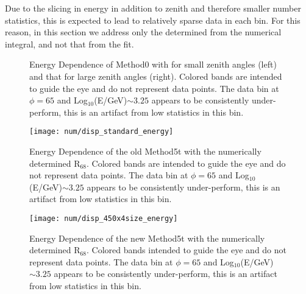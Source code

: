 \documentclass[main.tex]{subfiles}
\begin{document}
Due to the slicing in energy in addition to zenith and therefore smaller number statistics, this is expected to lead to relatively sparse data in each bin. For this reason, in this section we address only the \rse determined from the numerical integral, and not that from the fit.

\begin{figure}[htbp]
  \centering
  \caption[Energy Dependence of Method0.]{Energy Dependence of Method0 with \rse for small zenith angles (left) and that for large zenith angles (right). Colored bands are intended to guide the eye and do not represent data points. The data bin at $\phi = 65$ and Log$_{10}$(E/GeV)$\sim 3.25$ appears to be consistently under-perform, this is an artifact from low statistics in this bin.}
  \label{fig:energy_reg}
\end{figure}

\begin{figure}[htbp]
  \centering
  \texttt{[image: num/disp\_standard\_energy]}
  \caption[Energy Dependence of the old Method5t.]{Energy Dependence of the old Method5t with the numerically determined R$_{68}$. Colored bands are intended to guide the eye and do not represent data points. The data bin at $\phi = 65$ and Log$_{10}$(E/GeV)$\sim 3.25$  appears to be consistently under-perform, this is an artifact from low statistics in this bin.}
  \label{fig:energy_disp_standard}    
\end{figure}

\begin{figure}[htbp]
  \centering
  \texttt{[image: num/disp\_450x4size\_energy]}
  \caption[Energy Dependence of the new Method5t.]{Energy Dependence of the new Method5t with the numerically determined R$_{68}$. Colored bands intended to guide the eye and do not represent data points. The data bin at $\phi = 65$ and Log$_{10}$(E/GeV)$\sim 3.25$  appears to be consistently under-perform, this is an artifact from low statistics in this bin.}
  \label{fig:energy_disp_450}    
\end{figure}
\end{document}
